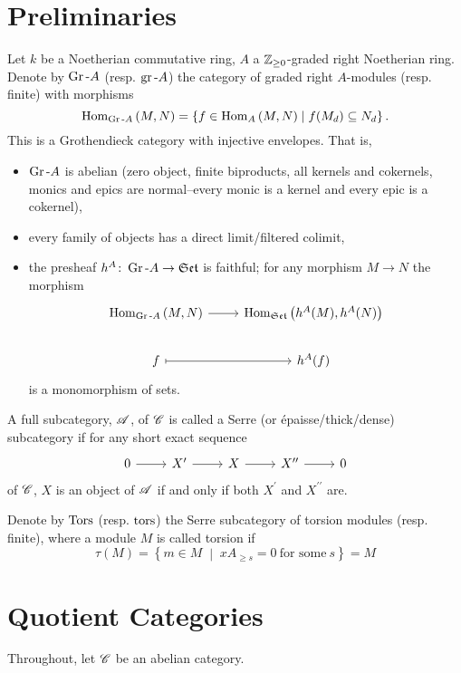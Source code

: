 \documentclass[dissertation.tex]{subfiles}
\begin{document}
\section{Preliminaries}
Let $k$ be a Noetherian commutative ring, $A$ a $\mathbb{Z}_{\geq 0}$-graded right Noetherian ring.
Denote by $\operatorname{Gr}\text{-}A$ (resp. $\operatorname{gr}\text{-}A$) the category of graded right $A$-modules (resp. finite) with morphisms
$$\operatorname{Hom}_{\operatorname{Gr}\text{-}A}\left(M,N\right) = \left\{f \in \operatorname{Hom}_{A}\left(M,N\right) \;\middle\vert\; f(M_d) \subseteq N_d\right\}.$$
This is a Grothendieck category with injective envelopes.
That is,
\begin{itemize}
\item
  $\operatorname{Gr}\text{-}A$ is abelian (zero object, finite biproducts, all kernels and cokernels, monics and epics are normal--every monic is a kernel and every epic is a cokernel),
\item
  every family of objects has a direct limit/filtered colimit,
\item
  the presheaf $h^A \colon \operatorname{Gr}\text{-}A \rightarrow \mathfrak{Set}$ is faithful; for any morphism $M \rightarrow N$ the morphism
  $$\begin{tikzcd}
    \Hom{\Gr{A}}{M, N} \arrow{r}& \Hom{\Sets}{h^A(M), h^A(N)}\\
    f \arrow[mapsto]{r} & h^A(f)
  \end{tikzcd}$$
  is a monomorphism of sets.
\end{itemize}

\begin{defn}
  A full subcategory, $\mathscr{A}$, of $\mathscr{C}$ is called a Serre (or \'{e}paisse/thick/dense) subcategory if for any short exact sequence
  $$\begin{tikzcd}
    0 \arrow{r} & X^\prime \arrow{r} & X \arrow{r} & X^{\prime\prime} \arrow{r} & 0
  \end{tikzcd}$$
  of $\mathscr{C}$, $X$ is an object of $\mathscr{A}$ if and only if both $X^\prime$ and $X^{\prime\prime}$ are.
\end{defn}

Denote by $\operatorname{Tors}$ (resp. $\operatorname{tors}$) the Serre subcategory of torsion modules (resp. finite), where a module $M$ is called torsion if
$$\tau(M) = \left\{m \in M \;\middle\vert\; xA_{\geq s} = 0\ \text{for some}\ s\right\} = M$$

\section{Quotient Categories}
Throughout, let $\mathscr{C}$ be an abelian category.
\end{document}
